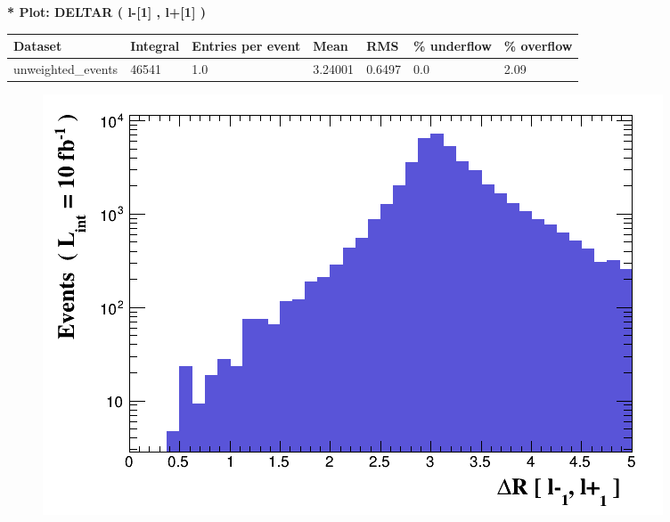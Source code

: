 \documentclass[a4paper, 10pt]{article}
\begin{document}
\textbf{* Plot: DELTAR ( l-[1] , l+[1] ) }\\
   \begin{table}[H]
  \begin{center}
    \begin{tabular}{|m{23.0mm}|m{23.0mm}|m{18.0mm}|m{19.0mm}|m{19.0mm}|m{19.0mm}|m{19.0mm}|}
      \hline
      {\cellcolor{yellow}         Dataset}& {\cellcolor{yellow}         Integral}& {\cellcolor{yellow}         Entries per event}& {\cellcolor{yellow}         Mean}& {\cellcolor{yellow}         RMS}& {\cellcolor{yellow}         \% underflow}& {\cellcolor{yellow}         \% overflow}\\
      \hline
      {\cellcolor{white}         unweighted\_events}& {\cellcolor{white}         46541}& {\cellcolor{white}         1.0}& {\cellcolor{white}         3.24001}& {\cellcolor{white}         0.6497}& {\cellcolor{green}         0.0}& {\cellcolor{green}         2.09}\\
\hline
    \end{tabular}
  \end{center}
\end{table}

\begin{figure}[H]
  \begin{center}
    \includegraphics[scale=0.45]{selection_21.png}\\
\caption{   }
  \end{center}
\end{figure}
      
\end{document}
